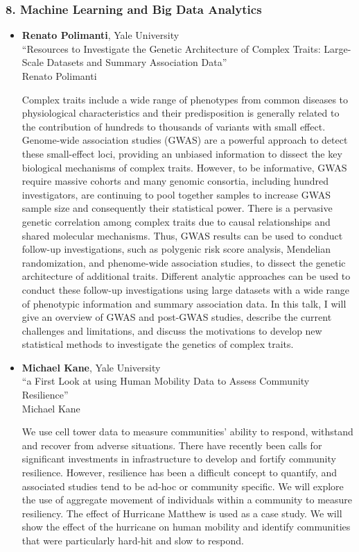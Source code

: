 \subsubsection*{8. Machine Learning and Big Data Analytics}

\begin{itemize}
\item \textbf{Renato Polimanti}, Yale University \\
``Resources to Investigate the Genetic Architecture of Complex Traits: Large-Scale  Datasets and Summary Association Data'' \\
Renato Polimanti


Complex traits include a wide range of phenotypes from common diseases to physiological characteristics and their predisposition is generally related to the contribution of hundreds to thousands of variants with small effect. Genome-wide association studies (GWAS) are a powerful approach to detect these small-effect loci, providing an unbiased information to dissect the key biological mechanisms of complex traits. However, to be informative, GWAS require massive cohorts and many genomic consortia, including hundred investigators, are continuing to pool together samples to increase GWAS sample size and consequently their statistical power. There is a pervasive genetic correlation among complex traits due to causal relationships and shared molecular mechanisms. Thus, GWAS results can be used to conduct follow-up investigations, such as polygenic risk score analysis, Mendelian randomization, and phenome-wide association studies, to dissect the genetic architecture of additional traits. Different analytic approaches can be used to conduct these follow-up investigations using large datasets with a wide range of phenotypic information and summary association data. In this talk, I will give an overview of GWAS and post-GWAS studies, describe the current challenges and limitations, and discuss the motivations to develop new statistical methods to investigate the genetics of complex traits.

\item \textbf{Michael Kane}, Yale University \\
``a First Look at using Human Mobility Data to Assess Community Resilience'' \\
Michael Kane


We use cell tower data to measure communities' ability to respond, withstand and recover from adverse situations. There have recently been calls for significant investments in infrastructure to develop and fortify community resilience. However, resilience has been a difficult concept to quantify, and associated studies tend to be ad-hoc or community specific. We will explore the use of aggregate movement of individuals within a community to measure resiliency. The effect of Hurricane Matthew is used as a case study. We will show the effect of the hurricane on human mobility and identify communities that were particularly hard-hit and slow to respond.


\end{itemize}
